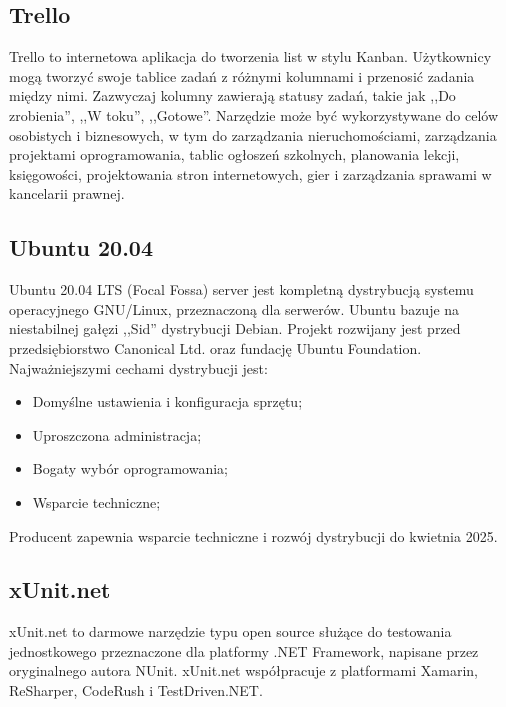 \documentclass[12pt,a4paper]{article}
\begin{document}
		\subsection{Trello}
			\indent Trello to internetowa aplikacja do tworzenia list w stylu Kanban. Użytkownicy mogą tworzyć swoje tablice zadań z różnymi kolumnami i przenosić zadania
		między nimi. Zazwyczaj kolumny zawierają statusy zadań, takie jak ,,Do zrobienia'', ,,W toku'', ,,Gotowe''. Narzędzie może być wykorzystywane do celów osobistych i biznesowych,
		w tym do zarządzania nieruchomościami, zarządzania projektami oprogramowania, tablic ogłoszeń szkolnych, planowania lekcji, księgowości, projektowania stron internetowych,
		gier i zarządzania sprawami w kancelarii prawnej.
		
		\subsection{Ubuntu 20.04}		
		\indent Ubuntu 20.04 LTS (Focal Fossa) server jest kompletną dystrybucją systemu operacyjnego GNU/Linux, przeznaczoną dla serwerów. Ubuntu bazuje na niestabilnej gałęzi ,,Sid''
			dystrybucji Debian. Projekt rozwijany jest przed przedsiębiorstwo Canonical Ltd. oraz fundację Ubuntu Foundation. Najważniejszymi cechami dystrybucji jest:
			\begin{itemize}
				\item Domyślne ustawienia i konfiguracja sprzętu;
				\item Uproszczona administracja;
				\item Bogaty wybór oprogramowania;
				\item Wsparcie techniczne;
			\end{itemize}
			Producent zapewnia wsparcie techniczne i rozwój dystrybucji do kwietnia 2025.
			
		\subsection{xUnit.net}
			\indent xUnit.net to darmowe narzędzie typu open source służące do testowania jednostkowego
			przeznaczone dla platformy .NET Framework, napisane przez oryginalnego autora NUnit.
			xUnit.net współpracuje z platformami Xamarin, ReSharper, CodeRush i TestDriven.NET.
		
\end{document}
